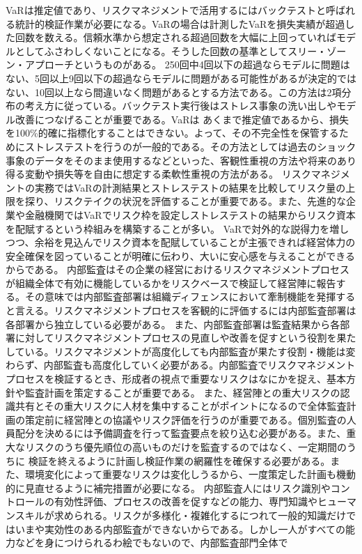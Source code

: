 \documentclass[12pt]{jsarticle}
\begin{document}
VaRは推定値であり、リスクマネジメントで活用するにはバックテストと呼ばれる統計的検証作業が必要になる。VaRの場合は計測したVaRを損失実績が超過した回数を数える。信頼水準から想定される超過回数を大幅に上回っていればモデルとしてふさわしくないことになる。そうした回数の基準としてスリー・ゾーン・アプローチというものがある。
250回中4回以下の超過ならモデルに問題はない、5回以上9回以下の超過ならモデルに問題がある可能性があるが決定的ではない、10回以上なら間違いなく問題があるとする方法である。この方法は2項分布の考え方に従っている。バックテスト実行後はストレス事象の洗い出しやモデル改善につなげることが重要である。VaRは
あくまで推定値であるから、損失を100\%的確に指標化することはできない。よって、その不完全性を保管するためにストレステストを行うのが一般的である。その方法としては過去のショック事象のデータをそのまま使用するなどといった、客観性重視の方法や将来のあり得る変動や損失等を自由に想定する柔軟性重視の方法がある。
リスクマネジメントの実務ではVaRの計測結果とストレステストの結果を比較してリスク量の上限を探り、リスクテイクの状況を評価することが重要である。また、先進的な企業や金融機関ではVaRでリスク枠を設定しストレステストの結果からリスク資本を配賦するという枠組みを構築することが多い。
VaRで対外的な説得力を増しつつ、余裕を見込んでリスク資本を配賦していることが主張できれば経営体力の安全確保を図っていることが明確に伝わり、大いに安心感を与えることができるからである。
内部監査はその企業の経営におけるリスクマネジメントプロセスが組織全体で有効に機能しているかをリスクベースで検証して経営陣に報告する。その意味では内部監査部署は組織ディフェンスにおいて牽制機能を発揮すると言える。リスクマネジメントプロセスを客観的に評価するには内部監査部署は各部署から独立している必要がある。
また、内部監査部署は監査結果から各部署に対してリスクマネジメントプロセスの見直しや改善を促すという役割を果たしている。リスクマネジメントが高度化しても内部監査が果たす役割・機能は変わらず、内部監査も高度化していく必要がある。内部監査でリスクマネジメントプロセスを検証するとき、形成者の視点で重要なリスクはなにかを捉え、基本方針や監査計画を策定することが重要である。
また、経営陣との重大リスクの認識共有とその重大リスクに人材を集中することがポイントになるので全体監査計画の策定前に経営陣との協議やリスク評価を行うのが重要である。個別監査の人員配分を決めるには予備調査を行って監査要点を絞り込む必要がある。また、重大なリスクのうち優先順位の高いものだけを監査するのではなく、一定期間のうちに
検証を終えるように計画し検証作業の網羅性を確保する必要がある。また、環境変化によって重要なリスクは変化しうるから、一度策定した計画も機動的に見直せるように補完措置が必要になる。
内部監査人にはリスク識別やコントロールの有効性評価、プロセスの改善を促すなどの能力、専門知識やヒューマンスキルが求められる。リスクが多様化・複雑化するにつれて一般的知識だけではいまや実効性のある内部監査ができないからである。しかし一人がすべての能力などを身につけられるわ絵でもないので、内部監査部門全体で
\end{document}
